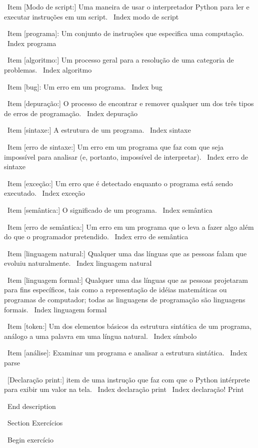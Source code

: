 \documentclass[10pt]{book}
\begin{document}
\begin {itemize}
{\ Item [Modo de script:] Uma maneira de usar o interpretador Python para ler
e executar instruções em um script.
\ Index {modo de script}

\ Item [programa]: Um conjunto de instruções que especifica uma computação.
\ Index {programa}

\ Item [algoritmo:] Um processo geral para a resolução de uma categoria de
problemas.
\ Index {algoritmo}

\ Item [bug]: Um erro em um programa.
\ Index {bug}

\ Item [depuração:] O processo de encontrar e remover qualquer um dos
três tipos de erros de programação.
\ Index {depuração}

\ Item [sintaxe:] A estrutura de um programa.
\ Index {} sintaxe

\ Item [erro de sintaxe:] Um erro em um programa que faz com que seja impossível
para analisar (e, portanto, impossível de interpretar).
\ Index {erro de sintaxe}

\ Item [exceção:] Um erro que é detectado enquanto o programa está sendo executado.
\ Index {exceção}

\ Item [semântica:] O significado de um programa.
\ Index {} semântica

\ Item [erro de semântica:] Um erro em um programa que o leva a fazer algo
além do que o programador pretendido.
\ Index {erro de semântica}

\ Item [linguagem natural:] Qualquer uma das línguas que as pessoas falam que
evoluiu naturalmente.
\ Index {linguagem natural}

\ Item [linguagem formal:] Qualquer uma das línguas que as pessoas projetaram
para fins específicos, tais como a representação de idéias matemáticas ou
programas de computador; todas as linguagens de programação são linguagens formais.
\ Index {linguagem formal}

\ Item [token:] Um dos elementos básicos da estrutura sintática de
um programa, análogo a uma palavra em uma língua natural.
\ Index {símbolo}

\ Item [análise]: Examinar um programa e analisar a estrutura sintática.
\ Index {} parse

\ [Declaração print:] item de uma instrução que faz com que o Python
intérprete para exibir um valor na tela.
\ Index {declaração print}
\ Index {declaração! Print}


\ End {description}


\ Section {Exercícios}

\ Begin {} exercício

}
\end{itemize}
\end{document}
